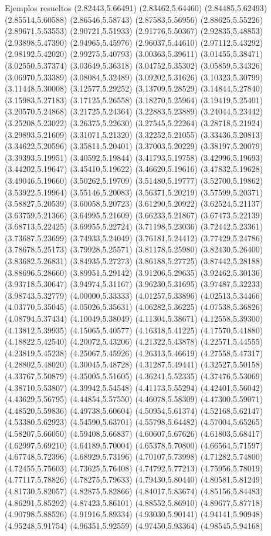 \documentclass[11pt,a4paper]{article}
\begin{document}
\begin{fmex}{Ejemplos resueltos}
(2.82443,5.66491) (2.83462,5.64460) (2.84485,5.62493) (2.85514,5.60588) (2.86546,5.58743) (2.87583,5.56956) (2.88625,5.55226) (2.89671,5.53553) (2.90721,5.51933) (2.91776,5.50367) (2.92835,5.48853) (2.93898,5.47390) (2.94965,5.45976) (2.96037,5.44610) (2.97112,5.43292) (2.98192,5.42020) (2.99275,5.40793) (3.00363,5.39611) (3.01455,5.38471) (3.02550,5.37374) (3.03649,5.36318) (3.04752,5.35302) (3.05859,5.34326) (3.06970,5.33389) (3.08084,5.32489) (3.09202,5.31626) (3.10323,5.30799) (3.11448,5.30008) (3.12577,5.29252) (3.13709,5.28529) (3.14844,5.27840) (3.15983,5.27183) (3.17125,5.26558) (3.18270,5.25964) (3.19419,5.25401) (3.20570,5.24868) (3.21725,5.24364) (3.22883,5.23889) (3.24044,5.23442) (3.25208,5.23022) (3.26375,5.22630) (3.27545,5.22264) (3.28718,5.21924) (3.29893,5.21609) (3.31071,5.21320) (3.32252,5.21055) (3.33436,5.20813) (3.34622,5.20596) (3.35811,5.20401) (3.37003,5.20229) (3.38197,5.20079) (3.39393,5.19951) (3.40592,5.19844) (3.41793,5.19758) (3.42996,5.19693) (3.44202,5.19647) (3.45410,5.19622) (3.46620,5.19616) (3.47832,5.19628) (3.49046,5.19660) (3.50262,5.19709) (3.51480,5.19777) (3.52700,5.19862) (3.53922,5.19964) (3.55146,5.20083) (3.56371,5.20219) (3.57599,5.20371) (3.58827,5.20539) (3.60058,5.20723) (3.61290,5.20922) (3.62524,5.21137) (3.63759,5.21366) (3.64995,5.21609) (3.66233,5.21867) (3.67473,5.22139) (3.68713,5.22425) (3.69955,5.22724) (3.71198,5.23036) (3.72442,5.23361) (3.73687,5.23699) (3.74933,5.24049) (3.76181,5.24412) (3.77429,5.24786) (3.78678,5.25173) (3.79928,5.25571) (3.81178,5.25980) (3.82430,5.26400) (3.83682,5.26831) (3.84935,5.27273) (3.86188,5.27725) (3.87442,5.28188) (3.88696,5.28660) (3.89951,5.29142) (3.91206,5.29635) (3.92462,5.30136) (3.93718,5.30647) (3.94974,5.31167) (3.96230,5.31695) (3.97487,5.32233) (3.98743,5.32779) (4.00000,5.33333) (4.01257,5.33896) (4.02513,5.34466) (4.03770,5.35045) (4.05026,5.35631) (4.06282,5.36225) (4.07538,5.36826) (4.08794,5.37434) (4.10049,5.38049) (4.11304,5.38671) (4.12558,5.39300) (4.13812,5.39935) (4.15065,5.40577) (4.16318,5.41225) (4.17570,5.41880) (4.18822,5.42540) (4.20072,5.43206) (4.21322,5.43878) (4.22571,5.44555) (4.23819,5.45238) (4.25067,5.45926) (4.26313,5.46619) (4.27558,5.47317) (4.28802,5.48020) (4.30045,5.48728) (4.31287,5.49441) (4.32527,5.50158) (4.33767,5.50879) (4.35005,5.51605) (4.36241,5.52335) (4.37476,5.53069) (4.38710,5.53807) (4.39942,5.54548) (4.41173,5.55294) (4.42401,5.56042) (4.43629,5.56795) (4.44854,5.57550) (4.46078,5.58309) (4.47300,5.59071) (4.48520,5.59836) (4.49738,5.60604) (4.50954,5.61374) (4.52168,5.62147) (4.53380,5.62923) (4.54590,5.63701) (4.55798,5.64482) (4.57004,5.65265) (4.58207,5.66050) (4.59408,5.66837) (4.60607,5.67626) (4.61803,5.68417) (4.62997,5.69210) (4.64189,5.70004) (4.65378,5.70800) (4.66564,5.71597) (4.67748,5.72396) (4.68929,5.73196) (4.70107,5.73998) (4.71282,5.74800) (4.72455,5.75603) (4.73625,5.76408) (4.74792,5.77213) (4.75956,5.78019) (4.77117,5.78826) (4.78275,5.79633) (4.79430,5.80440) (4.80581,5.81249) (4.81730,5.82057) (4.82875,5.82866) (4.84017,5.83674) (4.85156,5.84483) (4.86291,5.85292) (4.87423,5.86101) (4.88552,5.86910) (4.89677,5.87718) (4.90798,5.88526) (4.91916,5.89334) (4.93030,5.90141) (4.94141,5.90948) (4.95248,5.91754) (4.96351,5.92559) (4.97450,5.93364) (4.98545,5.94168) 
\end{fmex}
\end{document}
